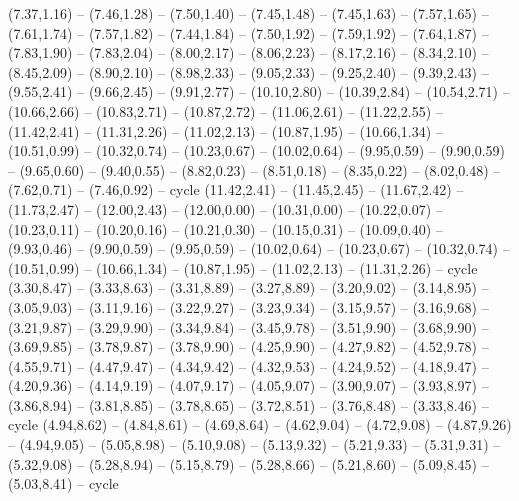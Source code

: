 \expandafter\def\csname geo:gebiet:1945-Hungary\endcsname{
  (7.37,1.16) -- (7.46,1.28) -- (7.50,1.40) -- (7.45,1.48) -- (7.45,1.63) -- (7.57,1.65) -- (7.61,1.74) -- (7.57,1.82) -- (7.44,1.84) -- (7.50,1.92) -- (7.59,1.92) -- (7.64,1.87) -- (7.83,1.90) -- (7.83,2.04) -- (8.00,2.17) -- (8.06,2.23) -- (8.17,2.16) -- (8.34,2.10) -- (8.45,2.09) -- (8.90,2.10) -- (8.98,2.33) -- (9.05,2.33) -- (9.25,2.40) -- (9.39,2.43) -- (9.55,2.41) -- (9.66,2.45) -- (9.91,2.77) -- (10.10,2.80) -- (10.39,2.84) -- (10.54,2.71) -- (10.66,2.66) -- (10.83,2.71) -- (10.87,2.72) -- (11.06,2.61) -- (11.22,2.55) -- (11.42,2.41) -- (11.31,2.26) -- (11.02,2.13) -- (10.87,1.95) -- (10.66,1.34) -- (10.51,0.99) -- (10.32,0.74) -- (10.23,0.67) -- (10.02,0.64) -- (9.95,0.59) -- (9.90,0.59) -- (9.65,0.60) -- (9.40,0.55) -- (8.82,0.23) -- (8.51,0.18) -- (8.35,0.22) -- (8.02,0.48) -- (7.62,0.71) -- (7.46,0.92) -- cycle}
\expandafter\def\csname geo:gebiet:1945-Romania\endcsname{
  (11.42,2.41) -- (11.45,2.45) -- (11.67,2.42) -- (11.73,2.47) -- (12.00,2.43) -- (12.00,0.00) -- (10.31,0.00) -- (10.22,0.07) -- (10.23,0.11) -- (10.20,0.16) -- (10.21,0.30) -- (10.15,0.31) -- (10.09,0.40) -- (9.93,0.46) -- (9.90,0.59) -- (9.95,0.59) -- (10.02,0.64) -- (10.23,0.67) -- (10.32,0.74) -- (10.51,0.99) -- (10.66,1.34) -- (10.87,1.95) -- (11.02,2.13) -- (11.31,2.26) -- cycle}
\expandafter\def\csname geo:gebiet:1945-Denmark\endcsname{
  (3.30,8.47) -- (3.33,8.63) -- (3.31,8.89) -- (3.27,8.89) -- (3.20,9.02) -- (3.14,8.95) -- (3.05,9.03) -- (3.11,9.16) -- (3.22,9.27) -- (3.23,9.34) -- (3.15,9.57) -- (3.16,9.68) -- (3.21,9.87) -- (3.29,9.90) -- (3.34,9.84) -- (3.45,9.78) -- (3.51,9.90) -- (3.68,9.90) -- (3.69,9.85) -- (3.78,9.87) -- (3.78,9.90) -- (4.25,9.90) -- (4.27,9.82) -- (4.52,9.78) -- (4.55,9.71) -- (4.47,9.47) -- (4.34,9.42) -- (4.32,9.53) -- (4.24,9.52) -- (4.18,9.47) -- (4.20,9.36) -- (4.14,9.19) -- (4.07,9.17) -- (4.05,9.07) -- (3.90,9.07) -- (3.93,8.97) -- (3.86,8.94) -- (3.81,8.85) -- (3.78,8.65) -- (3.72,8.51) -- (3.76,8.48) -- (3.33,8.46) -- cycle
  (4.94,8.62) -- (4.84,8.61) -- (4.69,8.64) -- (4.62,9.04) -- (4.72,9.08) -- (4.87,9.26) -- (4.94,9.05) -- (5.05,8.98) -- (5.10,9.08) -- (5.13,9.32) -- (5.21,9.33) -- (5.31,9.31) -- (5.32,9.08) -- (5.28,8.94) -- (5.15,8.79) -- (5.28,8.66) -- (5.21,8.60) -- (5.09,8.45) -- (5.03,8.41) -- cycle}
